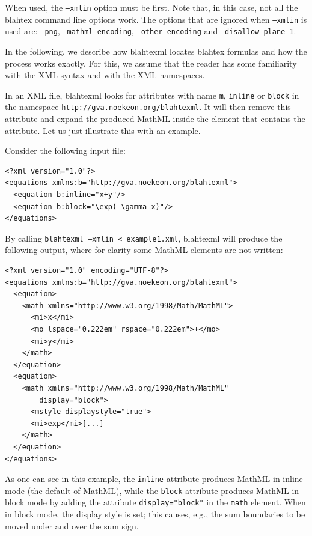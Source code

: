 \documentclass{article}
\begin{document}
When used, the \texttt{--xmlin} option must be first. Note that, in this case, not all the blahtex command line options work. The options that are ignored when \texttt{--xmlin} is used are: \texttt{--png}, \texttt{--mathml-encoding}, \texttt{--other-encoding} and \texttt{--disallow-plane-1}.

In the following, we describe how blahtexml locates blahtex formulas and how the process works exactly. For this, we assume that the reader has some familiarity with the XML syntax and with the XML namespaces.

In an XML file, blahtexml looks for attributes with name \texttt{m}, \texttt{inline} or \texttt{block} in the namespace \texttt{http://gva.noekeon.org/blahtexml}. It will then remove this attribute and expand the produced MathML inside the element that contains the attribute. Let us just illustrate this with an example.

Consider the following input file:
\begin{verbatim}
<?xml version="1.0"?>
<equations xmlns:b="http://gva.noekeon.org/blahtexml">
  <equation b:inline="x+y"/>
  <equation b:block="\exp(-\gamma x)"/>
</equations>
\end{verbatim}

By calling \texttt{blahtexml --xmlin < example1.xml}, blahtexml will produce the following output, where for clarity some MathML elements are not written:
\begin{verbatim}
<?xml version="1.0" encoding="UTF-8"?>
<equations xmlns:b="http://gva.noekeon.org/blahtexml">
  <equation>
    <math xmlns="http://www.w3.org/1998/Math/MathML">
      <mi>x</mi>
      <mo lspace="0.222em" rspace="0.222em">+</mo>
      <mi>y</mi>
    </math>
  </equation>
  <equation>
    <math xmlns="http://www.w3.org/1998/Math/MathML"
        display="block">
      <mstyle displaystyle="true">
      <mi>exp</mi>[...]
    </math>
  </equation>
</equations>
\end{verbatim}

As one can see in this example, the \texttt{inline} attribute produces MathML in inline mode (the default of MathML), while the \texttt{block} attribute produces MathML in block mode by adding the attribute \texttt{display="block"} in the \texttt{math} element. When in block mode, the display style is set; this causes, e.g., the sum boundaries to be moved under and over the sum sign.
\end{document}
